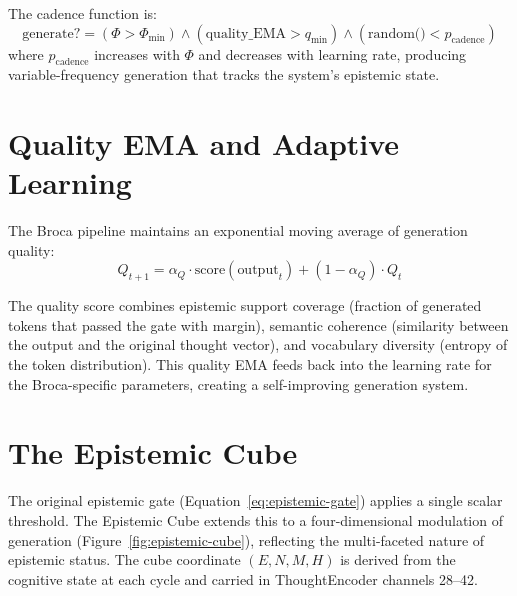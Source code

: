 \documentclass[12pt]{book}
\begin{document}
The cadence function is:
\begin{equation}
\text{generate?} = (\Phi > \Phi_{\text{min}}) \wedge (\text{quality\_EMA} > q_{\text{min}}) \wedge (\text{random()} < p_{\text{cadence}})
\end{equation}
where $p_{\text{cadence}}$ increases with $\Phi$ and decreases with learning rate, producing variable-frequency generation that tracks the system's epistemic state.

\section{Quality EMA and Adaptive Learning}

The Broca pipeline maintains an exponential moving average of generation quality:
\begin{equation}
Q_{t+1} = \alpha_Q \cdot \text{score}(\text{output}_t) + (1 - \alpha_Q) \cdot Q_t
\end{equation}

The quality score combines epistemic support coverage (fraction of generated tokens that passed the gate with margin), semantic coherence (similarity between the output and the original thought vector), and vocabulary diversity (entropy of the token distribution). This quality EMA feeds back into the learning rate for the Broca-specific parameters, creating a self-improving generation system.

\section{The Epistemic Cube}
\label{sec:epistemic-cube}

The original epistemic gate (Equation~\ref{eq:epistemic-gate}) applies a single scalar threshold. The Epistemic Cube extends this to a four-dimensional modulation of generation (Figure~\ref{fig:epistemic-cube}), reflecting the multi-faceted nature of epistemic status. The cube coordinate $(E, N, M, H)$ is derived from the cognitive state at each cycle and carried in ThoughtEncoder channels 28--42.
\end{document}
